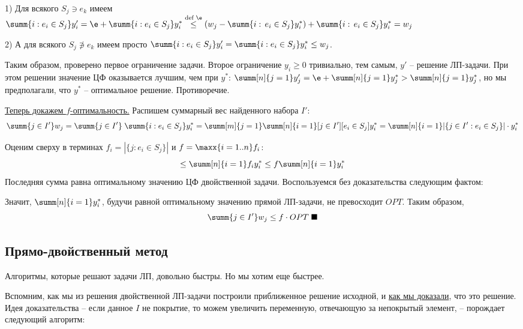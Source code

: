 1) Для всякого $S_j \ni e_k$ имеем $\summ{i: e_i \in S_j} y_i' = \e + \summ{i: e_i \in S_j} y_i^* \overset{\text{def }\e}{\leq} (w_j - \summ{i:\, e_i \in S_j}y_i^*) + \summ{i:\, e_i \in S_j}y_i^* = w_j$

2) А для всякого $S_j \not\ni e_k$ имеем просто $\summ{i: e_i \in S_j} y_i' = \summ{i: e_i \in S_j} y_i^* \leq w_j$. 

Таким образом, проверено первое ограничение задачи. Второе ограничение $y_i \geq 0$ тривиально, тем самым, $y'$ -- решение ЛП-задачи. При этом решении значение ЦФ оказывается лучшим, чем при $y^*$: $\summ[n]{j=1}y_j' = \e + \summ[n]{j=1} y_j^* > \summ[n]{j=1} y_j^*$, но мы предполагали, что $y^*$ -- оптимальное решение. Противоречие. 

\underline{Теперь докажем $f$-оптимальность.}
Распишем суммарный вес найденного набора $I'$:
$$\summ{j\in I'} w_j = \summ{j\in I'} \; \summ{i: e_i \in S_j} y_i^* = \summ[m]{j=1}\summ[n]{i=1} [j \in I'] [e_i \in S_j] y_i^* = \summ[n]{i=1}|\{j \in I': e_i \in S_j\}|\cdot y_i^*$$

Оценим сверху в терминах $f_i = |\{j: e_i \in S_j\}|$ и $f = \maxx{i=1..n} f_i$:
$$ \leq \summ[n]{i=1}f_iy_i^* \leq f\summ[n]{i=1} y_i^*$$
Последняя сумма равна оптимальному значению ЦФ двойственной задачи. Воспользуемся без доказательства следующим фактом:


Значит, $\summ[n]{i=1} y_i^*$, будучи равной оптимальному значению прямой ЛП-задачи, не превосходит $OPT$. Таким образом, $$\summ{j\in I'} w_j \leq f\cdot OPT \; \blacksquare$$

\subsection{Прямо-двойственный метод}

Алгоритмы, которые решают задачи ЛП, довольно быстры. Но мы хотим еще быстрее.


Вспомним, как мы из решения двойственной ЛП-задачи построили приближенное решение исходной, и \underline{как мы доказали}, что это решение. Идея доказательства -- если данное $I$ не покрытие, то можем увеличить переменную, отвечающую за непокрытый элемент, -- порождает следующий алгоритм:

